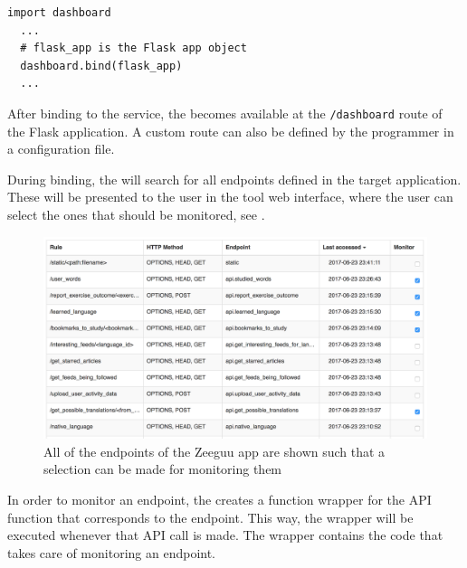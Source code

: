 \documentclass[conference]{IEEEtran}
\begin{document}
  \begin{lstlisting}[style=custompython]
  import dashboard
  ...
  # flask_app is the Flask app object
  dashboard.bind(flask_app)
  ...
  \end{lstlisting}



  After binding to the service, the \tool becomes available at the \texttt{/dashboard} route of the Flask application. A custom route can also be defined by the programmer in a configuration file.

  During binding, the \tool will search for all endpoints defined in the target application. These will be presented to the user in the tool web interface, where the user can select the ones that should be monitored, see . 

    \begin{figure}[h!]
      \centering
      \includegraphics[width=\linewidth]{selecting_endpoints.png}
      \caption{All of the endpoints of the Zeeguu app are shown such that a selection can be made for monitoring them}
      \label{fig:sep}
    \end{figure}

  In order to monitor an endpoint, the \tool creates a function wrapper for the API function that corresponds to the endpoint. This way, the wrapper will be executed whenever that API call is made. The wrapper contains the code that takes care of monitoring an endpoint.
%
\end{document}
